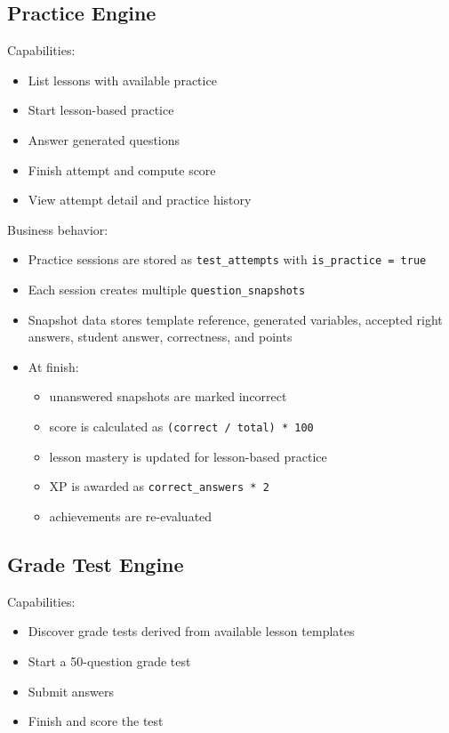 \documentclass[11pt,a4paper]{article}
\newcommand{\docpath}[1]{\texttt{#1}}
\begin{document}
\subsection{Practice Engine}

Capabilities:
\begin{itemize}[leftmargin=1.5em]
  \item List lessons with available practice
  \item Start lesson-based practice
  \item Answer generated questions
  \item Finish attempt and compute score
  \item View attempt detail and practice history
\end{itemize}

Business behavior:
\begin{itemize}[leftmargin=1.5em]
  \item Practice sessions are stored as \docpath{test\_attempts} with \docpath{is\_practice = true}
  \item Each session creates multiple \docpath{question\_snapshots}
  \item Snapshot data stores template reference, generated variables, accepted right answers, student answer, correctness, and points
  \item At finish:
  \begin{itemize}[leftmargin=2em]
    \item unanswered snapshots are marked incorrect
    \item score is calculated as \docpath{(correct / total) * 100}
    \item lesson mastery is updated for lesson-based practice
    \item XP is awarded as \docpath{correct\_answers * 2}
    \item achievements are re-evaluated
  \end{itemize}
\end{itemize}

\subsection{Grade Test Engine}

Capabilities:
\begin{itemize}[leftmargin=1.5em]
  \item Discover grade tests derived from available lesson templates
  \item Start a 50-question grade test
  \item Submit answers
  \item Finish and score the test
\end{itemize}
\end{document}
